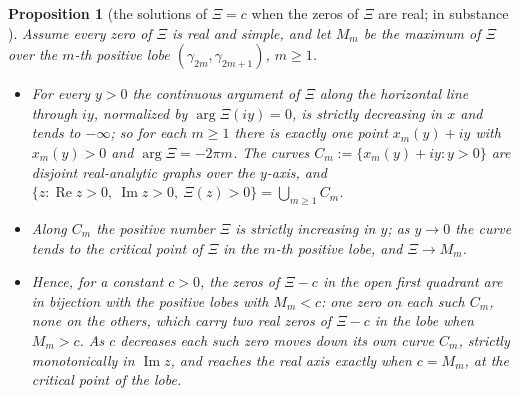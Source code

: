 \documentclass[11pt]{article}
\theoremstyle{plain}
\newtheorem{proposition}[theorem]{Proposition}
\theoremstyle{definition}
\theoremstyle{remark}
\newcommand{\re}{\operatorname{Re}}
\newcommand{\im}{\operatorname{Im}}
\begin{document}
\begin{proposition}[the solutions of $\Xi = c$ when the zeros of $\Xi$ are real; in substance {\cite{CS}}]\label{prop:frozen}
Assume every zero of $\Xi$ is real and simple, and let $M_m$ be the maximum of
$\Xi$ over the $m$-th positive lobe $(\gamma_{2m}, \gamma_{2m+1})$, $m \ge 1$.
\begin{itemize}
\item[(i)] For every $y > 0$ the continuous argument of $\Xi$ along the
horizontal line through $iy$, normalized by $\arg\Xi(iy) = 0$, is strictly
decreasing in $x$ and tends to $-\infty$; so for each $m \ge 1$ there is exactly
one point $x_m(y) + iy$ with $x_m(y) > 0$ and $\arg\Xi = -2\pi m$. The curves
$C_m := \{x_m(y) + iy : y > 0\}$ are disjoint real-analytic graphs over the
$y$-axis, and
$\{z : \re z > 0,\ \im z > 0,\ \Xi(z) > 0\} = \bigcup_{m \ge 1} C_m$.
\item[(ii)] Along $C_m$ the positive number $\Xi$ is strictly increasing in
$y$; as $y \to 0$ the curve tends to the critical point of $\Xi$ in the $m$-th
positive lobe, and $\Xi \to M_m$.
\item[(iii)] Hence, for a constant $c > 0$, the zeros of $\Xi - c$ in the open
first quadrant are in bijection with the positive lobes with $M_m < c$: one
zero on each such $C_m$, none on the others, which carry two real zeros of
$\Xi - c$ in the lobe when $M_m > c$. As $c$ decreases each such zero moves
down its own curve $C_m$, strictly monotonically in $\im z$, and reaches the
real axis exactly when $c = M_m$, at the critical point of the lobe.
\end{itemize}
\end{proposition}
\end{document}
